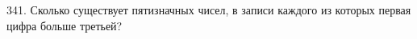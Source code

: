 341. Сколько существует пятизначных чисел, в записи каждого из которых первая цифра больше третьей?\\
